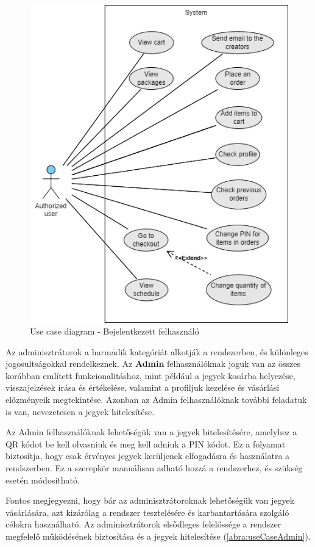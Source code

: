 \begin{itemize}
\begin{figure}[!h]
	\centering
	\includegraphics[scale=0.7]{images/useCaseA}
	\caption{Use case diagram - Bejelentkezett felhasználó}
	\label{abra:useCaseA}
\end{figure}
\pagebreak

Az adminisztrátorok a harmadik kategóriát alkotják a rendszerben, és különleges jogosultságokkal rendelkeznek. Az \textbf{Admin} felhasználóknak joguk van az összes korábban említett funkcionalitáshoz, mint például a jegyek kosárba helyezése, visszajelzések írása és értékelése, valamint a profiljuk kezelése és vásárlási előzményeik megtekintése. Azonban az Admin felhasználóknak további feladatuk is van, nevezetesen a jegyek hitelesítése.

Az Admin felhasználóknak lehetőségük van a jegyek hitelesítésére, amelyhez a QR kódot be kell olvasniuk és meg kell adniuk a PIN kódot. Ez a folyamat biztosítja, hogy csak érvényes jegyek kerüljenek elfogadásra és használatra a rendszerben. Ez a szerepkör manuálisan adható hozzá a rendszerhez, és szükség esetén módosítható.

Fontos megjegyezni, hogy bár az adminisztrátoroknak lehetőségük van jegyek vásárlására, azt kizárólag a rendszer tesztelésére és karbantartására szolgáló célokra használható. Az adminisztrátorok elsődleges felelőssége a rendszer megfelelő működésének biztosítása és a jegyek hitelesítése (\ref{abra:useCaseAdmin}).


\end{itemize}
